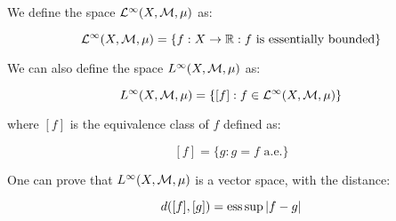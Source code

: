 \vspace{1em}

\begin{fdefinition}
    We define the space $\mathcal{L}^{\infty}(X, \mathcal{M}, \mu)$ as:

    $$\mathcal{L}^{\infty}(X, \mathcal{M}, \mu) = \{f: X \to \mathbb{R}: f \text{ is essentially bounded}\}$$

    We can also define the space $L^{\infty}(X, \mathcal{M}, \mu)$ as:

    $$L^{\infty}(X, \mathcal{M}, \mu) = \{[f]: f \in \mathcal{L}^{\infty}(X, \mathcal{M}, \mu)\}$$

    where $[f]$ is the equivalence class of $f$ defined as:

    $$[f] = \{g: g = f \text{ a.e.}\}$$
\end{fdefinition}

\begin{fremark}
    One can prove that $L^{\infty}(X, \mathcal{M}, \mu)$ is a vector space, with 
    the distance:

    $$d([f], [g]) = \operatorname{ess\,sup} |f - g|$$
\end{fremark}

